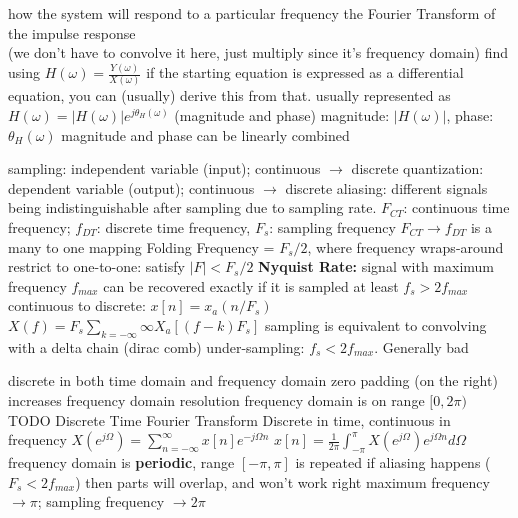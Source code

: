 \documentclass[12pt]{article}
\begin{document}
\begin{multicols*}{2}
\begin{flushleft}
\begin{outline}[longenum]
  \1 how the system will respond to a particular frequency
  \1 the Fourier Transform of the impulse response
    \\ (we don't have to convolve it here, just multiply since it's frequency domain)
  \1 find using $H(\omega)=\frac{Y(\omega)}{X(\omega)}$
    \2 if the starting equation is expressed as a differential equation, you can (usually) derive this from that.
  \1 usually represented as $H(\omega)=|H(\omega)|e^{j\theta_H(\omega)}$ (magnitude and phase)
    \2 magnitude: $|H(\omega)|$, phase: $\theta_H(\omega)$
  \1 magnitude and phase can be linearly combined

  \1 sampling: independent variable (input); continuous $\rightarrow$ discrete
  \1 quantization: dependent variable (output); continuous $\rightarrow$ discrete
  \1 aliasing: different signals being indistinguishable after sampling due to sampling rate.
  \1 $F_{CT}$: continuous time frequency; $f_{DT}$: discrete time frequency, $F_s$: sampling frequency 
  \1 $F_{CT} \rightarrow f_{DT}$ is a many to one mapping
    \2 Folding Frequency = $F_s/2$, where frequency wraps-around
    \2 restrict to one-to-one: satisfy $|F| < F_s / 2$
  \1 \textbf{Nyquist Rate:} signal with maximum frequency $f_{max}$ can be recovered exactly if it is sampled at least $f_s > 2f_{max}$
  \1 continuous to discrete:
    \2 $x[n] = x_a(n/F_s)$
    \2 $X(f) = F_s \sum_{k=-\infty}{\infty} X_a[(f-k)F_s]$
  \1 sampling is equivalent to convolving with a delta chain (dirac comb) %
  \1 under-sampling: $f_s<2 f_{max}$. Generally bad


  \1 discrete in both time domain and frequency domain
  \1 zero padding (on the right) increases frequency domain resolution
  \1 frequency domain is on range $[0, 2\pi)$
  \1 TODO
  \1 Discrete Time Fourier Transform
  \1 Discrete in time, continuous in frequency
  \1 $X(e^{j\Omega}) = \sum_{n=-\infty}^{\infty} x[n] e^{-j\Omega n}$
  \1 $x[n] = \frac{1}{2\pi} \int_{-\pi}^{\pi} X(e^{j\Omega}) e^{j\Omega n} d\Omega$
  \1 frequency domain is \textbf{periodic}, range $[-\pi,\pi]$ is repeated
    \2 if aliasing happens ($F_s < 2 f_{max}$) then parts will overlap, and won't work right
  \1 maximum frequency $\rightarrow \pi$; sampling frequency $\rightarrow 2\pi$




\end{outline}
\end{flushleft}
\end{multicols*}
\end{document}
